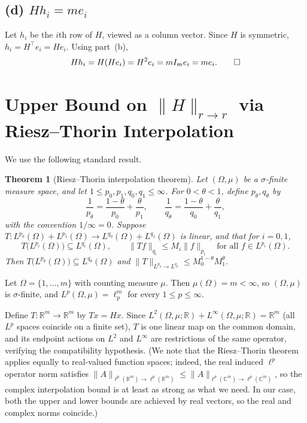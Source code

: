 \documentclass{article}
\newtheorem{theorem}{Theorem}
\begin{document}
\subsection*{(d) $Hh_i=me_i$}

Let $h_i$ be the $i$th row of $H$, viewed as a column vector. Since $H$ is symmetric, $h_i = H^\top e_i = He_i$. Using part~(b),
\[
Hh_i = H(He_i) = H^2e_i = mI_me_i = me_i. \qedhere
\]

\section{Upper Bound on $\|H\|_{r \to r}$ via Riesz--Thorin Interpolation}

We use the following standard result.

\begin{theorem}[Riesz--Thorin interpolation theorem]
Let $(\Omega,\mu)$ be a $\sigma$-finite measure space, and let $1\le p_0,p_1,q_0,q_1\le \infty$. For $0<\theta<1$, define $p_\theta,q_\theta$ by
\[
\frac1{p_\theta} = \frac{1-\theta}{p_0} + \frac{\theta}{p_1}, \qquad \frac1{q_\theta} = \frac{1-\theta}{q_0} + \frac{\theta}{q_1},
\]
with the convention $1/\infty=0$. Suppose $T:L^{p_0}(\Omega)+L^{p_1}(\Omega)\to L^{q_0}(\Omega)+L^{q_1}(\Omega)$ is linear, and that for $i=0,1$,
\[
T\bigl(L^{p_i}(\Omega)\bigr)\subseteq L^{q_i}(\Omega), \qquad \|Tf\|_{q_i}\le M_i\|f\|_{p_i} \quad\text{for all }f\in L^{p_i}(\Omega).
\]
Then $T\bigl(L^{p_\theta}(\Omega)\bigr)\subseteq L^{q_\theta}(\Omega)$ and $\|T\|_{L^{p_\theta}\to L^{q_\theta}} \le M_0^{1-\theta}M_1^\theta$.
\end{theorem}

Let $\Omega=\{1,\dots,m\}$ with counting measure $\mu$. Then $\mu(\Omega)=m<\infty$, so $(\Omega,\mu)$ is $\sigma$-finite, and $L^p(\Omega,\mu)=\ell_p^m$ for every $1\le p\le \infty$.

Define $T:\mathbb{R}^m\to \mathbb{R}^m$ by $Tx=Hx$. Since $L^2(\Omega,\mu;\mathbb{R})+L^\infty(\Omega,\mu;\mathbb{R})=\mathbb{R}^m$ (all $L^p$ spaces coincide on a finite set), $T$ is one linear map on the common domain, and its endpoint actions on $L^2$ and $L^\infty$ are restrictions of the same operator, verifying the compatibility hypothesis. (We note that the Riesz--Thorin theorem applies equally to real-valued function spaces; indeed, the real induced $\ell^p$ operator norm satisfies $\|A\|_{\ell^p(\mathbb{R}^m)\to\ell^p(\mathbb{R}^m)}\leq \|A\|_{\ell^p(\mathbb{C}^m)\to\ell^p(\mathbb{C}^m)}$, so the complex interpolation bound is at least as strong as what we need. In our case, both the upper and lower bounds are achieved by real vectors, so the real and complex norms coincide.)
\end{document}
